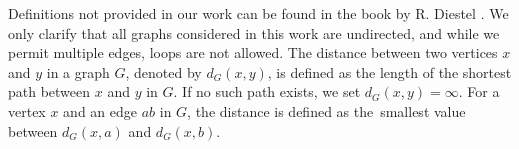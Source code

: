 


Definitions not provided in our work can be found in the book  by R. Diestel \cite{Diestel2010}.
We only clarify that all graphs considered in this work are undirected, and while we permit multiple edges, loops are not allowed. 
The distance between two vertices $x$ and $y$ in a graph $G$, denoted by $d_G(x,y)$, is defined as the length of the shortest path between $x$ and $y$ in $G$. If no such path exists, we set $d_G(x,y)=\infty$. For a vertex $x$ and an edge $ab$ in $G$, the distance is defined as the~smallest value between $d_G(x,a)$ and $d_G(x,b)$.
